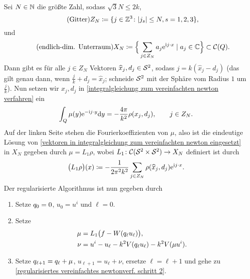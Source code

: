 Sei \(N\in\mathbb{N}\) die größte Zahl, sodass \(\sqrt{3}N\leq 2k\),
\begin{equation*}
	\tag{Gitter}
	Z_N\coloneqq\{j\in\mathbb{Z}^3\colon|j_s|\leq N,s=1,2,3\},
\end{equation*}
und
\begin{equation*}
	\tag{endlich-dim. Unterraum}
	X_N\coloneqq\Big\{\sum_{j\in Z_N}a_j\mathrm{e}^{\mathrm{i} j\cdot x}\mid a_j\in\mathbb{C}\Big\}\subset\mathcal{C}(Q).
\end{equation*}
Dann gibt es für alle \(j\in Z_N\) Vektoren \(\widehat{x}_j,d_j\in\mathcal{S}^2\), sodass \(j=k(\widehat{x}_j-d_j)\) (das gilt genau dann, wenn \(\frac{j}{k}+d_j=\widehat{x}_j\); schneide \(\mathcal{S}^2\) mit der Sphäre vom Radius \(1\) um \(\frac{j}{k}\)). Nun setzen wir \(x_j,d_j\) in \eqref{integralgleichung zum vereinfachten newton verfahren} ein
\begin{equation}
	\label{vektoren in integralgleichung zum vereinfachten newton eingesetzt}
	\int_Q\mu(y)\mathrm{e}^{-\mathrm{i} j\cdot y}\mathrm{d}y=-\frac{4\pi}{k^2}\rho(x_j,d_j),\qquad j\in Z_N.
\end{equation}
Auf der linken Seite stehen die Fourierkoeffizienten von \(\mu\), also ist die eindeutige Lösung von \eqref{vektoren in integralgleichung zum vereinfachten newton eingesetzt} in \(X_N\) gegeben durch \(\mu=L_1\rho\), wobei \(L_1\colon\mathcal{C}(\mathcal{S}^2\times\mathcal{S}^2) \to X_N\) definiert ist durch
\begin{equation}
	\label{definition operator L_1}
	\big(L_1\rho\big)(x)\coloneqq -\frac{1}{2\pi^2k^2}\sum_{j\in Z_N}\rho(\widehat{x}_j,d_j)\mathrm{e}^{\mathrm{i} j\cdot x}.
\end{equation}
Der regularisierte Algorithmus ist nun gegeben durch
\begin{enumerate}[label=(\alph*)]
	\item\label{regularisiertes vereinfachtes newtonverf. schritt 1} Setze \(q_0=0\), \(u_0=u^i\) und \(\ell=0\).
	\item\label{regularisiertes vereinfachtes newtonverf. schritt 2} Setze
	\begin{align*}
		\mu&=L_1\big(f-W(q_\ell u_\ell)\big),\\
		\nu&=u^i-u_\ell - k^2V(q_\ell u_\ell) - k^2V(\mu u^i).
	\end{align*}
	\item\label{regularisiertes vereinfachtes newtonverf. schritt 3} Setze \(q_{\ell+1}=q_\ell+\mu\), \(u_{\ell+1}=u_\ell+\nu\), ersetze \(\ell=\ell+1\) und gehe zu \ref{regularisiertes vereinfachtes newtonverf. schritt 2}.
\end{enumerate}
